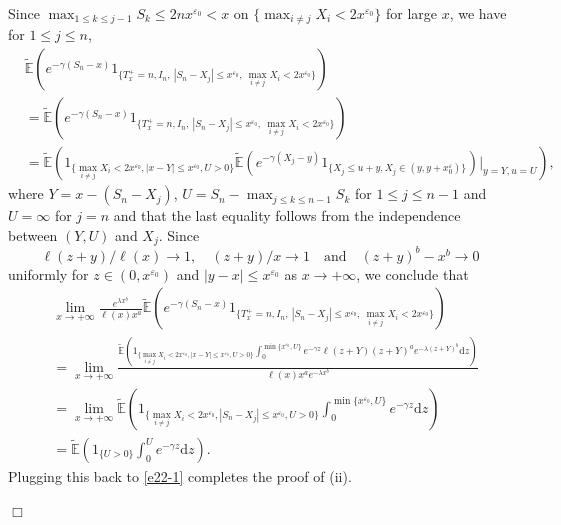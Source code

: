 \documentclass[11pt]{article}
\numberwithin{equation}{section}
\begin{document}
Since $\max_{1\leq k\leq j-1} S_k\leq 2n x^{\varepsilon_0}< x$ on $\{\max_{i\neq j} X_i<2x^{\varepsilon_0}\}$ for large $x$, we have for $1\leq j\leq n$,
\begin{align}
	& \widetilde{\mathbb{E}}\left(e^{-\gamma (S_n-x)}1_{\{T_x^+=n, I_n , \  |S_n-X_j|\leq x^{\varepsilon_0},\ \max_{i\neq j} X_i< 2x^{\varepsilon_0}\}}\right)\nonumber\\
	& = \widetilde{\mathbb{E}}\left(e^{-\gamma (S_n-x)}1_{\{T_x^+=n, I_n , \  |S_n-X_j|\leq x^{\varepsilon_0},\ \max_{i\neq j} X_i< 2x^{\varepsilon_0}\}}\right)\nonumber\\
	& = \widetilde{\mathbb{E}}\left( 1_{\{ \max_{i\neq j} X_i< 2x^{\varepsilon_0}, |x-Y| \leq x^{\varepsilon_0}, U>0\}} \widetilde{\mathbb{E}}\left(e^{-\gamma (X_j-y)}1_{\{ X_j \leq u+y, X_j \in (y, y+x^\varepsilon_0)\}}\right)\big|_{y=Y, u=U}\right),
\end{align}
where $Y= x-(S_n-X_j)$, $U=S_n- \max_{j\leq k\leq n-1} S_k$ for $1\leq j\leq n-1$ and $U=\infty$ for $j=n$ and that the last equality follows from the independence between $(Y, U)$ and $X_j$.
Since 
\[
\ell(z+y)/\ell(x) \to 1,\quad  (z+y)/x \to 1 \quad \mbox{and}\quad (z+y)^b -x^b \to 0
\]
uniformly for $z\in (0, x^{\varepsilon_0})$ and $|y-x|\leq  x^{\varepsilon_0}$ as $x\to+\infty$, we conclude that 
\begin{align}
	& \lim_{x\to+\infty} \frac{ e^{\lambda x^b} }{\ell(x) x^a } \widetilde{\mathbb{E}}\left(e^{-\gamma (S_n-x)}1_{\{T_x^+=n, I_n , \  |S_n-X_j| \leq x^{\varepsilon_0},\ \max_{i\neq j} X_i< 2x^{\varepsilon_0}\}}\right) \nonumber\\
	&= \lim_{x\to+\infty} \frac{  \widetilde{\mathbb{E}}\left( 1_{\{ \max_{i\neq j} X_i< 2x^{\varepsilon_0},  |x-Y|\leq x^{\varepsilon_0}, U>0\}} \int_{0}^{ \min\{x^{\varepsilon_0}, U\} }  e^{-\gamma z} \ell(z+Y) (z+Y)^a e^{-\lambda (z+Y)^b}\mathrm{d}z\right)}{\ell(x) x^a e^{-\lambda x^b}} \nonumber\\
	& = \lim_{x\to+\infty}    \widetilde{\mathbb{E}}\left( 1_{\{ \max_{i\neq j} X_i< 2x^{\varepsilon_0},  |S_n-X_j|\leq x^{\varepsilon_0}, U>0\}}  \int_{0}^{ \min\{x^{\varepsilon_0}, U\} }  e^{-\gamma z}   \mathrm{d}z\right) \nonumber\\
	& = \widetilde{\mathbb{E}}\left( 1_{\{ U>0\}}  \int_{0}^{ U }  e^{-\gamma z}   \mathrm{d}z\right) .
\end{align}
Plugging this back to \eqref{e22-1} completes the proof of (ii). 



\hfill$\Box$
\end{document}
